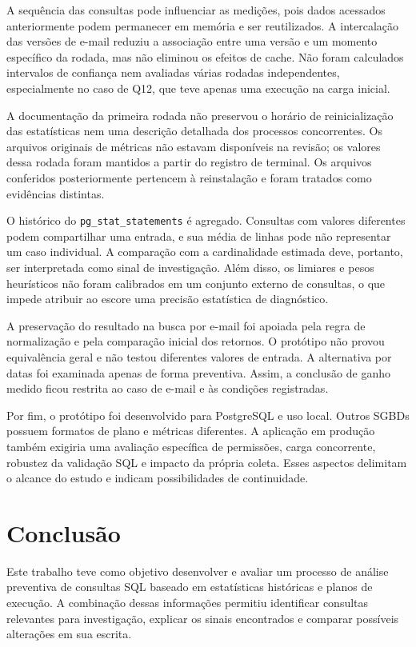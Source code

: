 \documentclass{UNESC}
\begin{document}
A sequência das consultas pode influenciar as medições, pois dados acessados anteriormente podem permanecer em memória e ser reutilizados. A intercalação das versões de e-mail reduziu a associação entre uma versão e um momento específico da rodada, mas não eliminou os efeitos de cache. Não foram calculados intervalos de confiança nem avaliadas várias rodadas independentes, especialmente no caso de Q12, que teve apenas uma execução na carga inicial.

A documentação da primeira rodada não preservou o horário de reinicialização das estatísticas nem uma descrição detalhada dos processos concorrentes. Os arquivos originais de métricas não estavam disponíveis na revisão; os valores dessa rodada foram mantidos a partir do registro de terminal. Os arquivos conferidos posteriormente pertencem à reinstalação e foram tratados como evidências distintas.

O histórico do \texttt{pg\_stat\_statements} é agregado. Consultas com valores diferentes podem compartilhar uma entrada, e sua média de linhas pode não representar um caso individual. A comparação com a cardinalidade estimada deve, portanto, ser interpretada como sinal de investigação. Além disso, os limiares e pesos heurísticos não foram calibrados em um conjunto externo de consultas, o que impede atribuir ao escore uma precisão estatística de diagnóstico.

A preservação do resultado na busca por e-mail foi apoiada pela regra de normalização e pela comparação inicial dos retornos. O protótipo não provou equivalência geral e não testou diferentes valores de entrada. A alternativa por datas foi examinada apenas de forma preventiva. Assim, a conclusão de ganho medido ficou restrita ao caso de e-mail e às condições registradas.

Por fim, o protótipo foi desenvolvido para PostgreSQL e uso local. Outros SGBDs possuem formatos de plano e métricas diferentes. A aplicação em produção também exigiria uma avaliação específica de permissões, carga concorrente, robustez da validação SQL e impacto da própria coleta. Esses aspectos delimitam o alcance do estudo e indicam possibilidades de continuidade.

\section{Conclusão}

Este trabalho teve como objetivo desenvolver e avaliar um processo de análise preventiva de consultas SQL baseado em estatísticas históricas e planos de execução. A combinação dessas informações permitiu identificar consultas relevantes para investigação, explicar os sinais encontrados e comparar possíveis alterações em sua escrita.
\end{document}
